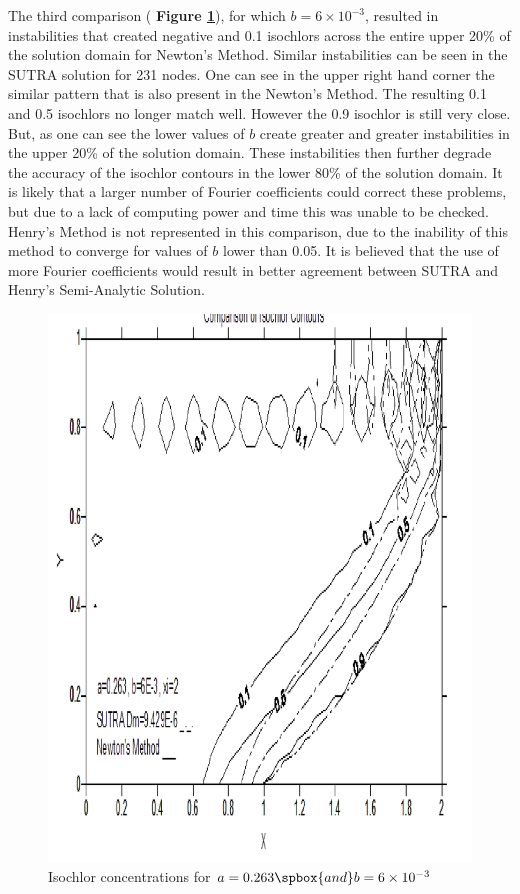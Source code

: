 The third comparison ( \textbf{Figure \ref{fig:b6x10-3}}), for which $b=6\times 10^{-3} $, resulted
in instabilities that created negative and 0.1 isochlors across the entire upper 20\% of the
solution domain for Newton's Method. Similar instabilities can be seen in the SUTRA solution for 231
nodes. One can see in the upper right hand corner the similar pattern that is also present in the
Newton's Method. The resulting 0.1 and 0.5 isochlors no longer match well.  However the 0.9 isochlor
is still very close. But, as one can see the lower values of $b$ create greater and greater
instabilities in the upper 20\% of the solution domain. These instabilities then further degrade the
accuracy of the isochlor contours in the lower 80\% of the solution domain. It is likely that a
larger number of Fourier coefficients could correct these problems, but due to a lack of computing
power and time this was unable to be checked. Henry's Method is not represented in this comparison,
due to the inability of this method to converge for values of $b$ lower than 0.05. It is believed
that the use of more Fourier coefficients would result in better agreement between SUTRA and Henry's
Semi-Analytic Solution.

\begin{figure}[htp]
    \centering
    \includegraphics[totalheight=0.45\textheight,viewport=3mm 4mm 205mm 292mm]{image4}
    \caption{Isochlor concentrations for $a = 0.263 \spbox{and} b = 6 \times
    10^{-3}$} \label{fig:b6x10-3}
\end{figure}
